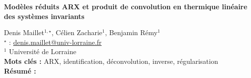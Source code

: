 


    \newpage


%
\begin{flushleft}
\addtocounter{section}{1}
{\Large \textbf{Modèles réduits ARX et produit de convolution en thermique linéaire des systèmes invariants}}\label{ref:49}
\end{flushleft}
%
Denis Maillet$^{1,\star}$, Célien Zacharie$^{1}$, Benjamin Rémy$^{1}$\\[2mm]
$^{\star}$ \Letter : \url{denis.maillet@univ-lorraine.fr}\\[2mm]
{\footnotesize $^{1}$ Université de Lorraine}\\
[4mm]
%
\noindent \textbf{Mots clés : } ARX, identification, déconvolution, inverse, régularisation\\[4mm]
%
\noindent \textbf{Résumé : } 

